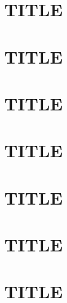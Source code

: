 
\section{TITLE}
\label{sec:bs7}


\section{TITLE}
\label{sec:bs8}


\section{TITLE}
\label{sec:bs9}


\section{TITLE}
\label{sec:bs10}


\section{TITLE}
\label{sec:bs11}


\section{TITLE}
\label{sec:bs12}


\section{TITLE}
\label{sec:bs13}

